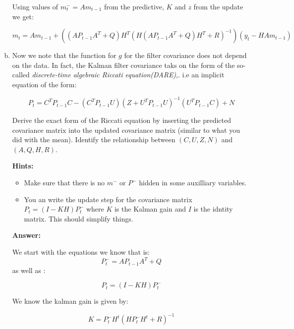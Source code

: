 \documentclass{tufte-handout}
\begin{document}
\begin{enumerate}[(a)]
Using values of $m^{-}_t = Am_{t-1}$ from the predictive,  $K$ and $z$ from the update we get: 

\begin{equation}
m_t = Am_{t-1} + \left((AP_{t-1} A^T + Q) H^T ( H (AP_{t-1}A^T + Q) H^T + R)^{-1} \right)  (y_t - H A m_{t-1})
\end{equation}


    
    \item Now we note that the function for $g$  for the filter covariance does not depend on the data. In fact, the Kalman filter covariance taks on the form of the so-called \emph{discrete-time algebraic Riccati equation(DARE)},. i.e an implicit equation of the form: 
    
    \begin{equation*}
        P_t = C^TP_{t-1}C - (C^T P_{t-1}U)(Z + U^TP_{t-1}U)^{-1}(U^TP_{t-1}C) + N
    \end{equation*}

    Derive the exact form of the Riccati equation by inserting the 
    predicted covariance matrix into the updated covariance matrix (similar to what you did with the mean). Identify the relationship
    between $(C, U, Z, N)$ and $(A, Q, H, R)$.

    
    \textbf{Hints:}
    \begin{itemize}
        \item Make sure that there is no $m^{-}$  or $P^{-}$ hidden in some auxilliary variables.
        \item You an write the update step for the covariance matrix $P_t = (I  - KH)P_t^{-}$ where $K$ is the Kalman gain and $I$ is the  idntity matrix. This should simplify things.
    \end{itemize}

    \textbf{Answer:}

   We start with the equations we know that is:
   \begin{equation}
        P_t^{-} = AP_{t-1}A^T + Q
        \label{predict-step}
   \end{equation}
   as well as :
   
   \begin{equation}
      P_t  = (I  - KH)P_t^{-}
      \label{update-step}
   \end{equation}

   We know the kalman gain is given by: 
   
   \begin{equation}
       K = P_t^{-}H^{t}(HP^{-}_t H^t + R)^{-1}
   \end{equation}
   

\end{enumerate}
\end{document}
